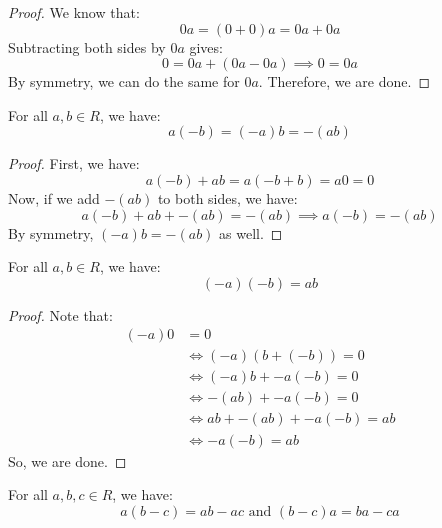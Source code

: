 \documentclass[letterpaper]{article}
\begin{document}
\begin{mdframed}[]
    \begin{proof}
        We know that: 
        \[0a = (0 + 0)a = 0a + 0a\]
        Subtracting both sides by $0a$ gives: 
        \[0 = 0a + (0a - 0a) \implies 0 = 0a\]
        By symmetry, we can do the same for $0a$. Therefore, we are done.
    \end{proof}    
\end{mdframed}

\begin{theorem}{}{}
    For all $a, b \in R$, we have:
    \[a(-b) = (-a)b = -(ab)\]
\end{theorem}

\begin{mdframed}[]
    \begin{proof}
        First, we have: 
        \[a(-b) + ab = a(-b + b) = a0 = 0\]
        Now, if we add $-(ab)$ to both sides, we have: 
        \[a(-b) + ab + -(ab) = -(ab) \implies a(-b) = -(ab)\]
        By symmetry, $(-a)b = -(ab)$ as well. 
    \end{proof}
\end{mdframed}

\begin{theorem}{}{}
    For all $a, b \in R$, we have: 
    \[(-a)(-b) = ab\]
\end{theorem}

\begin{mdframed}[nobreak=true]
    \begin{proof}
        Note that: 
        \begin{equation*}
            \begin{aligned}
                (-a)0 &= 0 \\ 
                    &\iff (-a)(b + (-b)) = 0 \\ 
                    &\iff (-a)b + -a(-b) = 0 \\ 
                    &\iff -(ab) + -a(-b) = 0 \\ 
                    &\iff ab + -(ab) + -a(-b) = ab \\
                    &\iff -a(-b) = ab
            \end{aligned}
        \end{equation*}
        So, we are done. 
    \end{proof}
\end{mdframed}

\begin{theorem}{}{}
    For all $a, b, c \in R$, we have: 
    \[a(b - c) = ab - ac \text{ and } (b - c)a = ba - ca\]
\end{theorem}
\end{document}
